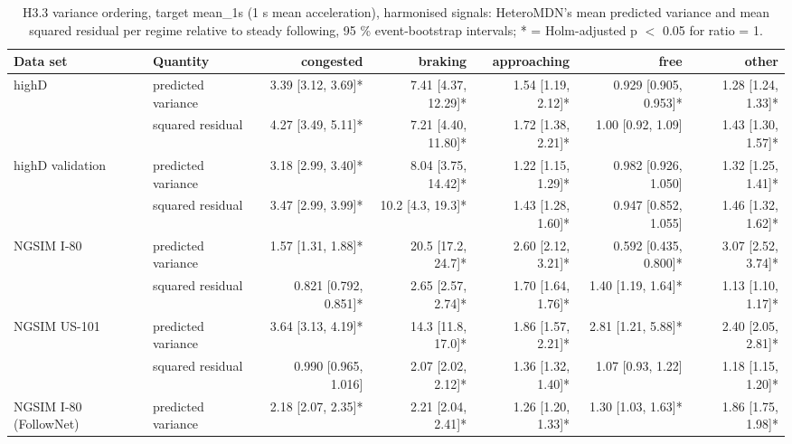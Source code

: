 \begin{table}[htbp]
\centering
\footnotesize
\caption{H3.3 variance ordering, target mean\_1s (1 s mean acceleration), harmonised signals: HeteroMDN's mean predicted variance and mean squared residual per regime relative to steady following, 95 \% event-bootstrap intervals; * = Holm-adjusted p $<$ 0.05 for ratio = 1.}
\label{tab:t3-regime-variance--harmonised--mean-1s}
\begin{tabular}{llrrrrr}
\toprule
Data set & Quantity & congested & braking & approaching & free & other \\
\midrule
highD & predicted variance & 3.39 [3.12, 3.69]* & 7.41 [4.37, 12.29]* & 1.54 [1.19, 2.12]* & 0.929 [0.905, 0.953]* & 1.28 [1.24, 1.33]* \\
 & squared residual & 4.27 [3.49, 5.11]* & 7.21 [4.40, 11.80]* & 1.72 [1.38, 2.21]* & 1.00 [0.92, 1.09] & 1.43 [1.30, 1.57]* \\
\midrule
highD validation & predicted variance & 3.18 [2.99, 3.40]* & 8.04 [3.75, 14.42]* & 1.22 [1.15, 1.29]* & 0.982 [0.926, 1.050] & 1.32 [1.25, 1.41]* \\
 & squared residual & 3.47 [2.99, 3.99]* & 10.2 [4.3, 19.3]* & 1.43 [1.28, 1.60]* & 0.947 [0.852, 1.055] & 1.46 [1.32, 1.62]* \\
\midrule
NGSIM I-80 & predicted variance & 1.57 [1.31, 1.88]* & 20.5 [17.2, 24.7]* & 2.60 [2.12, 3.21]* & 0.592 [0.435, 0.800]* & 3.07 [2.52, 3.74]* \\
 & squared residual & 0.821 [0.792, 0.851]* & 2.65 [2.57, 2.74]* & 1.70 [1.64, 1.76]* & 1.40 [1.19, 1.64]* & 1.13 [1.10, 1.17]* \\
\midrule
NGSIM US-101 & predicted variance & 3.64 [3.13, 4.19]* & 14.3 [11.8, 17.0]* & 1.86 [1.57, 2.21]* & 2.81 [1.21, 5.88]* & 2.40 [2.05, 2.81]* \\
 & squared residual & 0.990 [0.965, 1.016] & 2.07 [2.02, 2.12]* & 1.36 [1.32, 1.40]* & 1.07 [0.93, 1.22] & 1.18 [1.15, 1.20]* \\
\midrule
NGSIM I-80 (FollowNet) & predicted variance & 2.18 [2.07, 2.35]* & 2.21 [2.04, 2.41]* & 1.26 [1.20, 1.33]* & 1.30 [1.03, 1.63]* & 1.86 [1.75, 1.98]* \\

\end{tabular}
\end{table}
